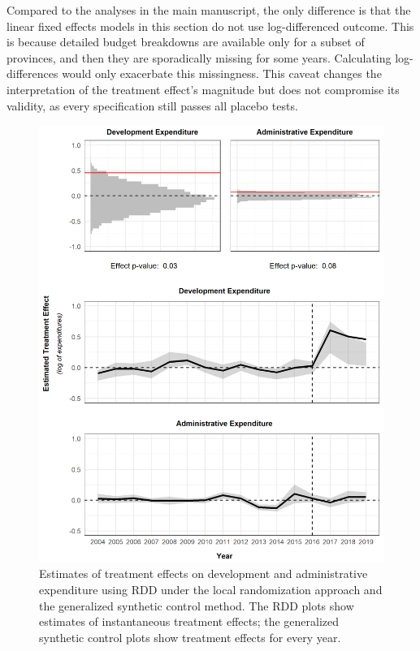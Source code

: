 \documentclass[12pt]{article}
\newcommand{\1}{\mathbbm{1}}
\begin{document}
Compared to the analyses in the main manuscript, the only difference is that the linear fixed effects models in this section do not use log-differenced outcome. This is because detailed budget breakdowns are available only for a subset of provinces, and then they are sporadically missing for some years. Calculating log-differences would only exacerbate this missingness. This caveat changes the interpretation of the treatment effect's magnitude but does not compromise its validity, as every specification still passes all placebo tests.



\begin{figure}[!htbp]
	\centering
	\includegraphics[]{figure/210202_mech_results.png}
	\captionsetup{singlelinecheck=off}
	\caption[Estimated RDD and synthetic control treatment effects]{Estimates of treatment effects on development and administrative expenditure using RDD under the local randomization approach and the generalized synthetic control method. The RDD plots show estimates of instantaneous treatment effects; the generalized synthetic control plots show treatment effects for every year.}
	\label{fig:synth_rdd_mech}
\end{figure}
\end{document}
